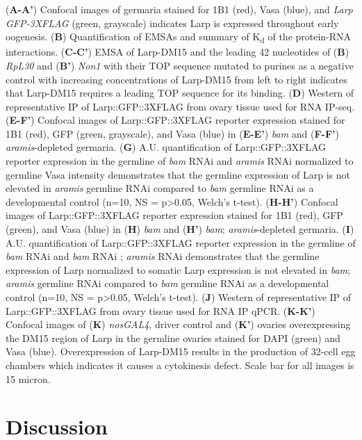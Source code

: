 \documentclass[12pt,oneside]{reedthesis}
\begin{document}
\setlength\parindent{0pt}(\textbf{A-A'}) Confocal images of germaria stained for 1B1 (red), Vasa (blue), and \emph{Larp GFP-3XFLAG} (green, grayscale) indicates Larp is expressed throughout early oogenesis. (\textbf{B}) Quantification of EMSAs and summary of K\textsubscript{d} of the protein-RNA interactions. (\textbf{C-C'}) EMSA of Larp-DM15 and the leading 42 nucleotides of (\textbf{B}) \emph{RpL30} and (\textbf{B'}) \emph{Non1} with their TOP sequence mutated to purines as a negative control with increasing concentrations of Larp-DM15 from left to right indicates that Larp-DM15 requires a leading TOP sequence for its binding. (\textbf{D}) Western of representative IP of Larp::GFP::3XFLAG from ovary tissue used for RNA IP-seq. (\textbf{E-F'}) Confocal images of Larp::GFP::3XFLAG reporter expression stained for 1B1 (red), GFP (green, grayscale), and Vasa (blue) in (\textbf{E-E'}) \emph{bam} and (\textbf{F-F'}) \emph{aramis}-depleted germaria. (\textbf{G}) A.U. quantification of Larp::GFP::3XFLAG reporter expression in the germline of \emph{bam} RNAi and \emph{aramis} RNAi normalized to germline Vasa intensity demonstrates that the germline expression of Larp is not elevated in \emph{aramis} germline RNAi compared to \emph{bam} germline RNAi as a developmental control (n=10, NS = p\textgreater0.05, Welch's t-test). (\textbf{H-H'}) Confocal images of Larp::GFP::3XFLAG reporter expression stained for 1B1 (red), GFP (green), and Vasa (blue) in (\textbf{H}) \emph{bam} and (\textbf{H'}) \emph{bam}; \emph{aramis}-depleted germaria. (\textbf{I}) A.U. quantification of Larp::GFP::3XFLAG reporter expression in the germline of \emph{bam} RNAi and \emph{bam} RNAi ; \emph{aramis} RNAi demonstrates that the germline expression of Larp normalized to somatic Larp expression is not elevated in \emph{bam}; \emph{aramis} germline RNAi compared to \emph{bam} germline RNAi as a developmental control (n=10, NS = p\textgreater0.05, Welch's t-test). (\textbf{J}) Western of representative IP of Larp::GFP::3XFLAG from ovary tissue used for RNA IP qPCR. (\textbf{K-K'}) Confocal images of (\textbf{K}) \emph{nosGAL4}, driver control and (\textbf{K'}) ovaries overexpressing the DM15 region of Larp in the germline ovaries stained for DAPI (green) and Vasa (blue). Overexpression of Larp-DM15 results in the production of 32-cell egg chambers which indicates it causes a cytokinesis defect. Scale bar for all images is 15 micron.

\textbf{\hfill\break
}

\hypertarget{discussion}{%
\section{Discussion}\label{discussion}}
\end{document}
